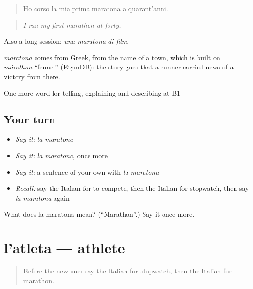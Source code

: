 \begin{quote}
Ho corso la mia prima maratona a quarant'anni.
\end{quote}

\begin{quote}
\emph{I ran my first marathon at forty.}
\end{quote}

Also a long session: \emph{una maratona di film}.

\begin{cousinweb}
\emph{maratona} comes from Greek, from the name of a town, which is built on \emph{márathon} \textquotedblleft{}fennel\textquotedblright{} (EtymDB): the story goes that a runner carried news of a victory from there.
\end{cousinweb}

\begin{grammarlens}[title={What you've built}]
One more word for telling, explaining and describing at B1.
\end{grammarlens}

\subsection*{Your turn}
\begin{itemize}
\raggedright
  \item \emph{Say it:} \emph{la maratona}
  \item \emph{Say it:} \emph{la maratona}, once more
  \item \emph{Say it:} a sentence of your own with \emph{la maratona}
  \item \emph{Recall:} say the Italian for to compete, then the Italian for stopwatch, then say \emph{la maratona} again
\end{itemize}

\begin{tcolorbox}[breakable,colback=teal!4,colframe=teal!35!black,title={Before you move on}]
What does la maratona mean? (\textquotedblleft{}Marathon\textquotedblright{}.) Say it once more.
\end{tcolorbox}
\section[l'atleta]{l'atleta — athlete}

\label{lesson:IT-C513-atleta}



\begin{quote}
Before the new one: say the Italian for stopwatch, then the Italian for marathon.
\end{quote}

